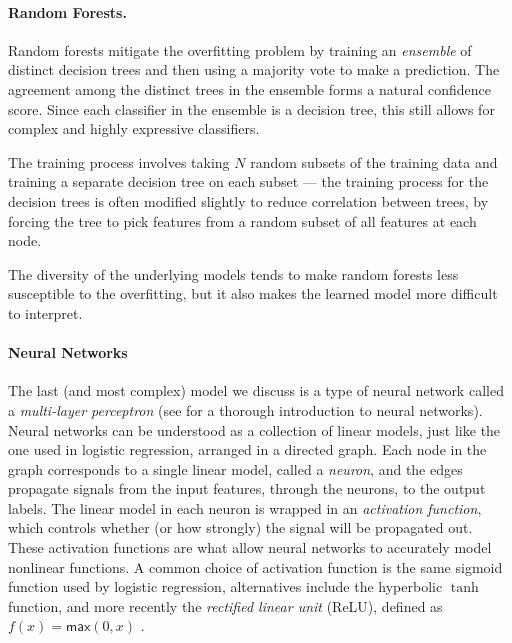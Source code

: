 \paragraph{Random Forests.} Random forests mitigate the overfitting problem by training an {\em{ensemble}} of distinct decision trees and then using a majority vote to make a prediction. The agreement among the distinct trees in the ensemble forms a natural confidence score. Since each classifier in the ensemble is a decision tree, this still allows for complex and highly expressive classifiers.  

%
%
The training process involves taking $N$ random subsets of the training
data and training a separate decision tree on each subset --- the
training process for the decision trees is often modified slightly to
reduce correlation between trees, by forcing the tree to pick features
from a random subset of all features at each node.
%

The diversity of the underlying models tends to make random forests less
susceptible to the overfitting, but it
also makes the learned model more difficult to interpret. 
%


\paragraph{Neural Networks}
The last (and most complex) model we discuss is a type of neural network
called a \emph{multi-layer perceptron} (see \citealt{Nielsen2015-pu} for
a thorough introduction to neural networks).
%
Neural networks can be understood as a collection of linear models, just
like the one used in logistic regression, arranged in a directed graph.
%
Each node in the graph corresponds to a single linear model, called a
\emph{neuron}, and the edges propagate signals from the input features,
through the neurons, to the output labels.
%
The linear model in each neuron is wrapped in an \emph{activation
  function}, which controls whether (or how strongly) the signal will be
propagated out.
%
These activation functions are what allow neural networks to accurately
model nonlinear functions.
%
A common choice of activation function is the same sigmoid function used
by logistic regression, alternatives include the hyperbolic $\tanh$
function, and more recently the \emph{rectified linear unit} (ReLU),
defined as $f(x) = \mathsf{max}(0,x)$ \citep{Nair2010-xg}.

